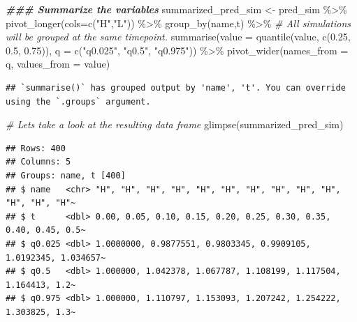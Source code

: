 \documentclass[
]{book}
\newenvironment{Shaded}{\begin{snugshade}}{\end{snugshade}}
\newcommand{\AttributeTok}[1]{\textcolor[rgb]{0.77,0.63,0.00}{#1}}
\newcommand{\CommentTok}[1]{\textcolor[rgb]{0.56,0.35,0.01}{\textit{#1}}}
\newcommand{\DocumentationTok}[1]{\textcolor[rgb]{0.56,0.35,0.01}{\textbf{\textit{#1}}}}
\newcommand{\FloatTok}[1]{\textcolor[rgb]{0.00,0.00,0.81}{#1}}
\newcommand{\FunctionTok}[1]{\textcolor[rgb]{0.00,0.00,0.00}{#1}}
\newcommand{\NormalTok}[1]{#1}
\newcommand{\OtherTok}[1]{\textcolor[rgb]{0.56,0.35,0.01}{#1}}
\newcommand{\SpecialCharTok}[1]{\textcolor[rgb]{0.00,0.00,0.00}{#1}}
\newcommand{\StringTok}[1]{\textcolor[rgb]{0.31,0.60,0.02}{#1}}
\theoremstyle{definition}
\theoremstyle{definition}
\theoremstyle{definition}
\theoremstyle{remark}
\begin{document}
\begin{Shaded}
\begin{Highlighting}[]
 \DocumentationTok{\#\#\# Summarize the variables}
\NormalTok{summarized\_pred\_sim }\OtherTok{\textless{}{-}}\NormalTok{ pred\_sim }\SpecialCharTok{\%\textgreater{}\%}
  \FunctionTok{pivot\_longer}\NormalTok{(}\AttributeTok{cols=}\FunctionTok{c}\NormalTok{(}\StringTok{"H"}\NormalTok{,}\StringTok{"L"}\NormalTok{)) }\SpecialCharTok{\%\textgreater{}\%}
  \FunctionTok{group\_by}\NormalTok{(name,t) }\SpecialCharTok{\%\textgreater{}\%}  \CommentTok{\# All simulations will be grouped at the same timepoint.}
  \FunctionTok{summarise}\NormalTok{(}\AttributeTok{value =} \FunctionTok{quantile}\NormalTok{(value, }\FunctionTok{c}\NormalTok{(}\FloatTok{0.25}\NormalTok{, }\FloatTok{0.5}\NormalTok{, }\FloatTok{0.75}\NormalTok{)), }\AttributeTok{q =} \FunctionTok{c}\NormalTok{(}\StringTok{"q0.025"}\NormalTok{, }\StringTok{"q0.5"}\NormalTok{, }\StringTok{"q0.975"}\NormalTok{)) }\SpecialCharTok{\%\textgreater{}\%}
  \FunctionTok{pivot\_wider}\NormalTok{(}\AttributeTok{names\_from =}\NormalTok{ q, }\AttributeTok{values\_from =}\NormalTok{ value)}
\end{Highlighting}
\end{Shaded}

\begin{verbatim}
## `summarise()` has grouped output by 'name', 't'. You can override using the `.groups` argument.
\end{verbatim}

\begin{Shaded}
\begin{Highlighting}[]
\CommentTok{\# Let\textquotesingle{}s take a look at the resulting data frame}
\FunctionTok{glimpse}\NormalTok{(summarized\_pred\_sim)}
\end{Highlighting}
\end{Shaded}

\begin{verbatim}
## Rows: 400
## Columns: 5
## Groups: name, t [400]
## $ name   <chr> "H", "H", "H", "H", "H", "H", "H", "H", "H", "H", "H", "H", "H"~
## $ t      <dbl> 0.00, 0.05, 0.10, 0.15, 0.20, 0.25, 0.30, 0.35, 0.40, 0.45, 0.5~
## $ q0.025 <dbl> 1.0000000, 0.9877551, 0.9803345, 0.9909105, 1.0192345, 1.034657~
## $ q0.5   <dbl> 1.000000, 1.042378, 1.067787, 1.108199, 1.117504, 1.164413, 1.2~
## $ q0.975 <dbl> 1.000000, 1.110797, 1.153093, 1.207242, 1.254222, 1.303825, 1.3~
\end{verbatim}
\end{document}
